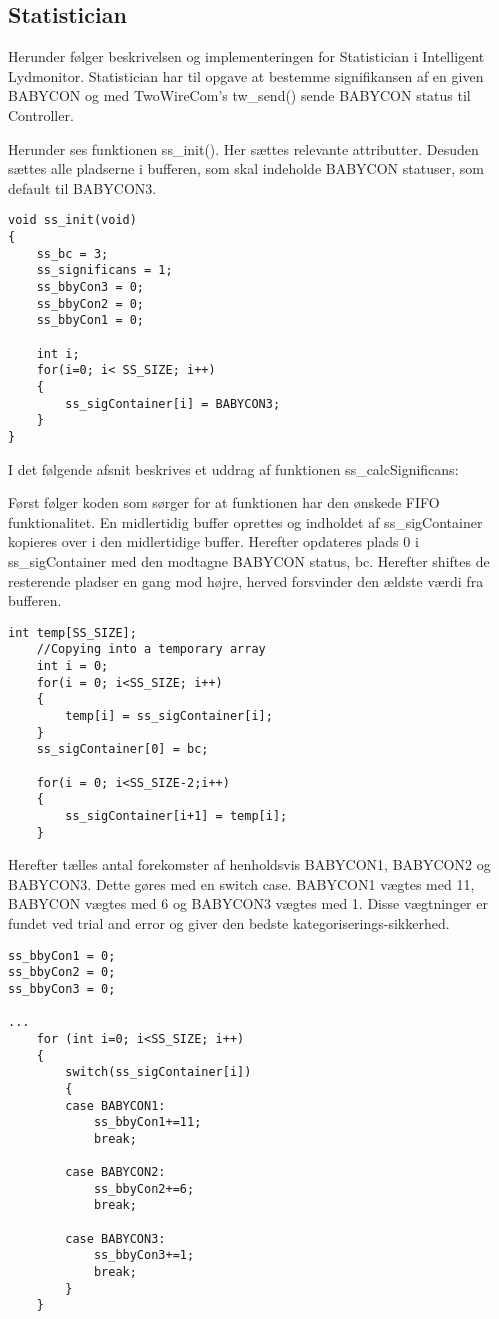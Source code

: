\subsection*{Statistician}
Herunder følger beskrivelsen og implementeringen for Statistician i Intelligent Lydmonitor.
Statistician har til opgave at bestemme signifikansen af en given BABYCON og med TwoWireCom's tw\_send() sende BABYCON status til Controller. 

Herunder ses funktionen ss\_init(). Her sættes relevante attributter. Desuden sættes alle pladserne i bufferen, som skal indeholde BABYCON statuser, som default til BABYCON3.
\begin{verbatim}
void ss_init(void)
{
    ss_bc = 3;
    ss_significans = 1;
    ss_bbyCon3 = 0;
    ss_bbyCon2 = 0;
    ss_bbyCon1 = 0;

    int i;
    for(i=0; i< SS_SIZE; i++)
    {
        ss_sigContainer[i] = BABYCON3;
    }
}
\end{verbatim}

I det følgende afsnit beskrives et uddrag af funktionen ss\_calcSignificans: 

Først følger koden som sørger for at funktionen har den ønskede FIFO funktionalitet. En midlertidig buffer oprettes og indholdet af ss\_sigContainer kopieres over i den midlertidige buffer. Herefter opdateres plads 0 i ss\_sigContainer med den modtagne BABYCON status, bc. Herefter shiftes de resterende pladser en gang mod højre, herved forsvinder den ældste værdi fra bufferen. 

\begin{verbatim}int temp[SS_SIZE];
    //Copying into a temporary array
    int i = 0;
    for(i = 0; i<SS_SIZE; i++)
    {
        temp[i] = ss_sigContainer[i];
    }
    ss_sigContainer[0] = bc;

    for(i = 0; i<SS_SIZE-2;i++)
    {
        ss_sigContainer[i+1] = temp[i];
    }
\end{verbatim}

Herefter tælles antal forekomster af henholdsvis BABYCON1, BABYCON2 og BABYCON3. Dette gøres med en switch case. BABYCON1 vægtes med 11, BABYCON vægtes med 6 og BABYCON3 vægtes med 1. Disse vægtninger er fundet ved trial and error og giver den bedste kategoriserings-sikkerhed. 

\begin{verbatim}
ss_bbyCon1 = 0;
ss_bbyCon2 = 0;
ss_bbyCon3 = 0;

...
    for (int i=0; i<SS_SIZE; i++)
    {
        switch(ss_sigContainer[i])
        {
        case BABYCON1:
            ss_bbyCon1+=11;
            break;

        case BABYCON2:
            ss_bbyCon2+=6;
            break;

        case BABYCON3:
            ss_bbyCon3+=1;
            break;
        }
    }
\end{verbatim}

